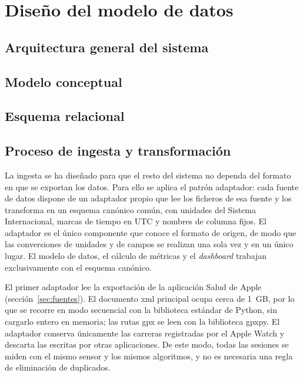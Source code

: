 \chapter{Diseño del modelo de datos}
\label{ch:modelo_datos}


\section{Arquitectura general del sistema}
\label{sec:arquitectura}

\section{Modelo conceptual}
\label{sec:modelo_conceptual}

\section{Esquema relacional}
\label{sec:esquema_relacional}

\section{Proceso de ingesta y transformación}
\label{sec:ingesta}

La ingesta se ha diseñado para que el resto del sistema no dependa del formato en que se exportan los datos. Para ello se aplica el patrón adaptador: cada fuente de datos dispone de un adaptador propio que lee los ficheros de esa fuente y los transforma en un esquema canónico común, con unidades del Sistema Internacional, marcas de tiempo en UTC y nombres de columna fijos. El adaptador es el único componente que conoce el formato de origen, de modo que las conversiones de unidades y de campos se realizan una sola vez y en un único lugar. El modelo de datos, el cálculo de métricas y el \textit{dashboard} trabajan exclusivamente con el esquema canónico.

El primer adaptador lee la exportación de la aplicación Salud de Apple (sección~\ref{sec:fuentes}). El documento \gls{xml} principal ocupa cerca de 1~GB, por lo que se recorre en modo secuencial con la biblioteca estándar de Python, sin cargarlo entero en memoria; las rutas \gls{gpx} se leen con la biblioteca gpxpy. El adaptador conserva únicamente las carreras registradas por el Apple Watch y descarta las escritas por otras aplicaciones. De este modo, todas las sesiones se miden con el mismo sensor y los mismos algoritmos, y no es necesaria una regla de eliminación de duplicados.

